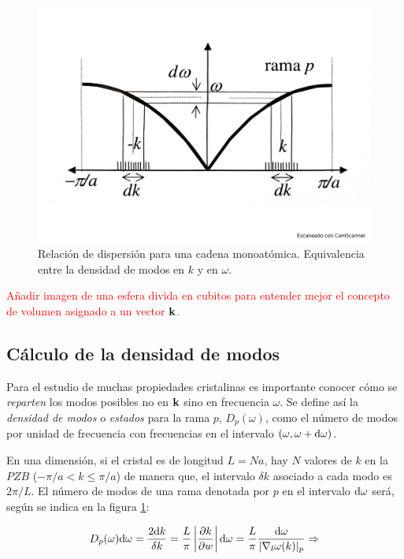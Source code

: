 \begin{figure}[h!] \centering
    \includegraphics[scale=0.36]{Cuerpo/Ch_05/Fotos libro 1.pdf}
    \caption{Relación de dispersión para una cadena monoatómica. Equivalencia entre la densidad de modos en $k$ y en $\omega$.}
    \label{Fig:05-01}
\end{figure}    
\begin{Anotacion}
\textcolor{red}{Añadir imagen de una esfera divida en cubitos para entender mejor el concepto de volumen asignado a un vector $\mathbf{k}$.}
\end{Anotacion}


\subsection{Cálculo de la densidad de modos}

Para el estudio de muchas propiedades cristalinas es importante conocer cómo se \textit{reparten} los modos posibles no en $\mathbf{k}$ sino en frecuencia $\omega$. Se define así la \textit{densidad de modos} o \textit{estados} para la rama $p$, $D_p (\omega)$, como el número de modos por unidad de frecuencia con frecuencias en el intervalo $(\omega,\omega+\mathrm{d} \omega)$.

En una dimensión, si el cristal es de longitud $L=Na$, hay $N$ valores de $k$ en la $PZB$ ($-\pi/a < k\leq \pi/a$) de manera que, el intervalo $\delta k$ asociado a cada modo es $2 \pi / L$. El número de modos de una rama denotada por $p$ en el intervalo $\mathrm{d} \omega$ será, según se indica en la figura \ref{Fig:05-01}:

\begin{equation*}
	D_p (\omega) \mathrm{d} \omega = \frac{2 \mathrm{d} k}{\delta k} = \frac{L}{\pi} \left| \frac{\partial k}{\partial w}  \right| \mathrm{d} \omega = \frac{L}{\pi} \frac{\mathrm{d} \omega}{|\nabla_l \omega (k)|_p} \Rightarrow
\end{equation*} 

